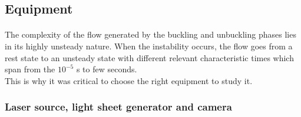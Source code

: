 \subsection{Equipment}
\paragraph{}
The complexity of the flow generated by the buckling and unbuckling phases lies in its highly unsteady nature. When the instability occurs, the flow goes from a rest state to an unsteady state with different relevant characteristic times which span from the $10^{-5}$ s to few seconds.\\ This is why it was critical to choose the right equipment to study it.
\subsubsection{Laser source, light sheet generator and camera}

